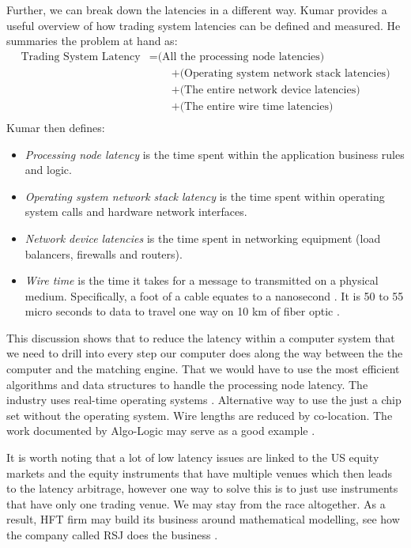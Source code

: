 \documentclass[12pt]{article}
\begin{document}
Further, we can break down the latencies in a different way. Kumar \cite{kumar} provides a useful overview of how trading system latencies can be defined and measured. He summaries the problem at hand as:
\begin{align}
\text{Trading System Latency} & = \text{(All the processing node latencies)} \nonumber \\
  & \qquad + \text{(Operating system network stack latencies)} \nonumber \\
  & \qquad + \text{(The entire network device latencies)} \nonumber \\
  & \qquad + \text{(The entire wire time latencies)} \nonumber \\
  \nonumber
\end{align}
Kumar \cite{kumar} then defines:
\begin{itemize}
\item \textit{Processing node latency} is the time spent within the application business rules and logic.
\item \textit{Operating system network stack latency} is the time spent within operating system calls and hardware network interfaces.
\item \textit{Network device latencies} is the time spent in networking equipment (load balancers, firewalls and routers).
\item \textit{Wire time} is the time it takes for a message to transmitted on a physical medium. Specifically, a foot of a cable equates to a nanosecond \cite{bbc}. It is 50 to 55 micro seconds to data to travel one way on 10 km of fiber optic \cite{kumar}.
\end{itemize}
This discussion shows that to reduce the latency within a computer system that we need to drill into every step our computer does along the way between the the computer and the matching engine. That we would have to use the most efficient algorithms and data structures to handle the processing node latency. The industry uses real-time operating systems \cite{durbin}. Alternative way to use the just a chip set without the operating system. Wire lengths are reduced by co-location. The work documented by Algo-Logic may serve as a good example \cite{lockwood}.

It is worth noting that a lot of low latency issues are linked to the US equity markets and the equity instruments that have multiple venues which then leads to the latency arbitrage, however one way to solve this is to just use instruments that have only one trading venue. We may stay from the race altogether. As a result, HFT firm may build its business around mathematical modelling, see how the company called RSJ does the business \cite{rsj}.
\end{document}

